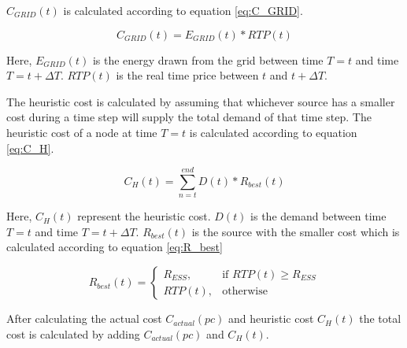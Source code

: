 $C_{GRID}(t)$ is calculated according to equation \ref{eq:C_GRID}.

\begin{equation}
\label{eq:C_GRID}
C_{GRID}(t) = E_{GRID}(t)*RTP(t)
\end{equation}

Here, $E_{GRID}(t)$ is the energy drawn from the grid between time $T=t$ and time $T=t+\Delta T$. $RTP(t)$ is the real time price between $t$ and $t+\Delta T$.

The heuristic cost is calculated by assuming that whichever source has a smaller cost during a time step will supply the total demand of that time step. The heuristic cost of a node at time $T = t$ is calculated according to equation \ref{eq:C_H}.


\begin{equation}
\label{eq:C_H}
C_H(t) = \sum_{n=t}^{end} D(t)*R_{best}(t)
\end{equation}

Here, $C_H(t)$ represent the heuristic cost. $D(t)$ is the demand between time $T = t$ and time $T = t+\Delta T$. $R_{best}(t)$ is the source with the smaller cost which is calculated according to equation \ref{eq:R_best}

\begin{equation}
\label{eq:R_best}
R_{best}(t) = 
\begin{cases}
    R_{ESS},& \text{if } RTP(t)\geq R_{ESS}\\
    RTP(t),              & \text{otherwise}
\end{cases}
\end{equation}

After calculating the actual cost  $C_{actual}(pc)$ and heuristic cost $C_H(t)$ the total cost is calculated by adding  $C_{actual}(pc)$ and $C_H(t)$.

